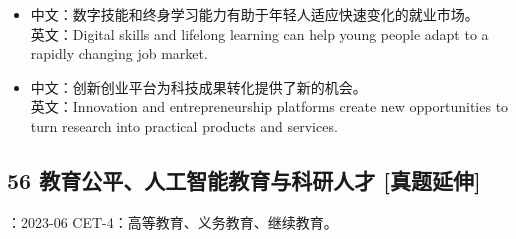 \documentclass[a4paper,11pt,UTF8,fontset=none]{ctexart}
\begin{document}
\par

\begin{itemize}[leftmargin=1.7em,itemsep=1pt,parsep=0pt,topsep=2pt]
\item \noindent 中文：数字技能和终身学习能力有助于年轻人适应快速变化的就业市场。\\ 英文：Digital skills and lifelong learning can help young people adapt to a rapidly changing job market.\par


\item \noindent 中文：创新创业平台为科技成果转化提供了新的机会。\\ 英文：Innovation and entrepreneurship platforms create new opportunities to turn research into practical products and services.\par


\end{itemize}

\subsection{56 教育公平、人工智能教育与科研人才 {\color{AccentBlue} [真题延伸]}}

\begin{tcolorbox}[enhanced,breakable,boxrule=0.35pt,colback=VeryPaleBlue,colframe=AccentBlue!40,left=7pt,right=7pt,top=4pt,bottom=4pt,borderline west={2pt}{0pt}{AccentBlue},before skip=4pt,after skip=6pt]
：2023-06 CET-4：高等教育、义务教育、继续教育。\par


\end{tcolorbox}
\end{document}
